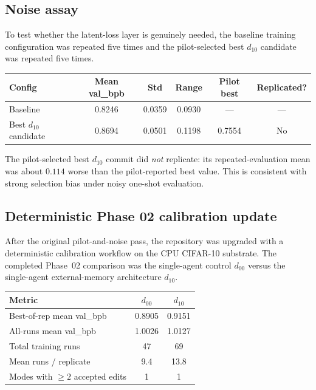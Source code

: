 \documentclass[11pt]{article}
\begin{document}
\subsection{Noise assay}

To test whether the latent-loss layer is genuinely needed, the baseline training configuration was
repeated five times and the pilot-selected best $d_{10}$ candidate was repeated five times.

\begin{center}
\begin{tabular}{lccccc}
\toprule
Config & Mean val\_bpb & Std & Range & Pilot best & Replicated? \\
\midrule
Baseline & 0.8246 & 0.0359 & 0.0930 & --- & --- \\
Best $d_{10}$ candidate & 0.8694 & 0.0501 & 0.1198 & 0.7554 & No \\
\bottomrule
\end{tabular}
\end{center}

The pilot-selected best $d_{10}$ commit did \emph{not} replicate:
its repeated-evaluation mean was about $0.114$ worse than the pilot-reported best value.
This is consistent with strong selection bias under noisy one-shot evaluation.

\subsection{Deterministic Phase 02 calibration update}

After the original pilot-and-noise pass, the repository was upgraded with a deterministic
calibration workflow on the CPU CIFAR-10 substrate. The completed Phase~02 comparison was the
single-agent control $d_{00}$ versus the single-agent external-memory architecture $d_{10}$.

\begin{center}
\begin{tabular}{lcc}
\toprule
Metric & $d_{00}$ & $d_{10}$ \\
\midrule
Best-of-rep mean val\_bpb & 0.8905 & 0.9151 \\
All-runs mean val\_bpb & 1.0026 & 1.0127 \\
Total training runs & 47 & 69 \\
Mean runs / replicate & 9.4 & 13.8 \\
Modes with $\ge 2$ accepted edits & 1 & 1 \\
\bottomrule
\end{tabular}
\end{center}
\end{document}
